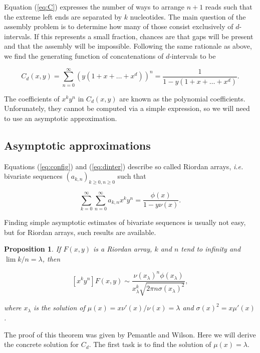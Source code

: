 \documentclass{article}
\newtheorem{proposition}{Proposition}
\begin{document}
Equation (\ref{eq:C}) expresses the number of ways to arrange $n+1$ reads
such that the extreme left ends are separated by $k$ nucleotides. The main
question of the assembly problem is to determine how many of those consist
exclusively of $d$-intervals. If this represents a small fraction, chances
are that gaps will be present and that the assembly will be impossible.
Following the same rationale as above, we find the generating function of
concatenations of $d$-intervals to be

\begin{equation}
\label{eq:dinter}
C_d(x,y) = \sum_{n=0}^\infty \left(y(1+x+\ldots+x^d)\right)^n =
\frac{1}{1-y(1+x+\ldots+x^d)}.
\end{equation}

The coefficients of $x^ky^n$ in $C_d(x,y)$ are known as the polynomial
coefficients. Unforunately, they cannot be computed via a simple
expression, so we will need to use an asymptotic approximation.

\subsection{Asymptotic approximations}

Equations (\ref{eq:config}) and (\ref{eq:dinter}) describe so called
Riordan arrays, \textit{i.e.} bivariate sequences $(a_{k,n})_{k \geq 0,
n \geq 0}$ such that

\begin{equation*}
\sum_{k=0}^\infty \sum_{n=0}^\infty a_{k,n} x^k y^n =
\frac{\phi(x)}{1-y \nu(x)}.
\end{equation*}

Finding simple asymptotic estimates of bivariate sequences is usually not
easy, but for Riordan arrays, such results are available.

\begin{proposition}
\label{th:PW}
If $F(x,y)$ is a Riordan array, $k$ and $n$ tend to infinity and $\lim k/n
= \lambda$, then

\begin{equation}
\label{eq:Cd}
[x^ky^n]F(x,y) \sim \frac{\nu(x_\lambda)^n\phi(x_\lambda)}
  {x_\lambda^k\sqrt{2\pi n \sigma(x_\lambda)^2}},
\end{equation}

\noindent
where $x_\lambda$ is the solution of
$\mu(x) = x\nu'(x)/\nu(x) = \lambda$ and $\sigma(x)^2 = x \mu'(x)$.
\end{proposition}

The proof of this theorem was given by Pemantle and Wilson. Here we will
derive the concrete solution for $C_d$. The first task is to find the
solution of $\mu(x) = \lambda$.
\end{document}
